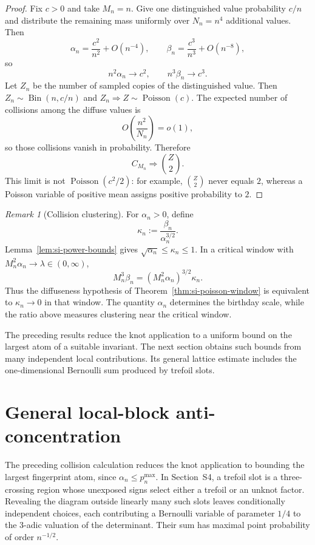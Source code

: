 \documentclass[9pt,twoside]{pnas-new}
\theoremstyle{definition}
\theoremstyle{remark}
\newtheorem{remark}[theorem]{Remark}
\begin{document}
\begin{proof}
Fix $c>0$ and take $M_n=n$. Give one distinguished value probability $c/n$ and distribute the remaining mass uniformly over $N_n=n^4$ additional values. Then
\[
\alpha_n=\frac{c^2}{n^2}+O(n^{-4}),
\qquad
\beta_n=\frac{c^3}{n^3}+O(n^{-8}),
\]
so
\[
n^2\alpha_n\to c^2,
\qquad
n^3\beta_n\to c^3.
\]
Let $Z_n$ be the number of sampled copies of the distinguished value. Then
$Z_n\sim\operatorname{Bin}(n,c/n)$ and
$Z_n\Longrightarrow Z\sim\operatorname{Poisson}(c)$. The expected number of collisions among the diffuse values is
\[
O\!\left(\frac{n^2}{N_n}\right)=o(1),
\]
so those collisions vanish in probability. Therefore
\begin{equation}
C_{M_n}\Longrightarrow\binom Z2.
\label{eq:si-heavy-limit}
\end{equation}
This limit is not $\operatorname{Poisson}(c^2/2)$: for example, $\binom Z2$ never equals $2$, whereas a Poisson variable of positive mean assigns positive probability to $2$.
\end{proof}

\begin{remark}[Collision clustering]
For $\alpha_n>0$, define
\begin{equation}
\kappa_n:=\frac{\beta_n}{\alpha_n^{3/2}}.
\label{eq:si-kappa}
\end{equation}
Lemma~\ref{lem:si-power-bounds} gives
$\sqrt{\alpha_n}\le\kappa_n\le1$. In a critical window with
$M_n^2\alpha_n\to\lambda\in(0,\infty)$,
\[
M_n^3\beta_n
=(M_n^2\alpha_n)^{3/2}\kappa_n.
\]
Thus the diffuseness hypothesis of Theorem~\ref{thm:si-poisson-window} is equivalent to $\kappa_n\to0$ in that window. The quantity $\alpha_n$ determines the birthday scale, while the ratio above measures clustering near the critical window.
\end{remark}

The preceding results reduce the knot application to a uniform bound on the largest atom of a suitable invariant. The next section obtains such bounds from many independent local contributions. Its general lattice estimate includes the one-dimensional Bernoulli sum produced by trefoil slots.
\section{General local-block anti-concentration}
\label{sec:si-local-block}
The preceding collision calculation reduces the knot application to bounding the largest fingerprint atom, since $\alpha_n\le p_n^{\max}$. In Section~S4, a trefoil slot is a three-crossing region whose unexposed signs select either a trefoil or an unknot factor. Revealing the diagram outside linearly many such slots leaves conditionally independent choices, each contributing a Bernoulli variable of parameter $1/4$ to the $3$-adic valuation of the determinant. Their sum has maximal point probability of order $n^{-1/2}$.
\end{document}
